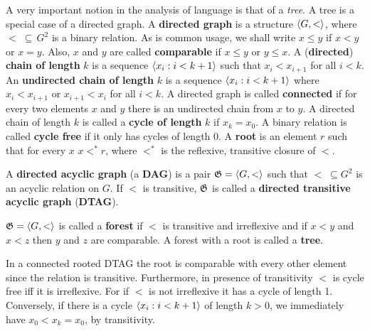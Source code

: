 A very important notion in the analysis of language is that of
a {\it tree}. A tree is a special case of a directed graph.
A \textbf{directed graph} is a structure $\langle G, <\rangle$, where
$<\; \subseteq\, G^2$ is a binary relation. As is common usage,
we shall write $x \leq y$ if $x < y$ or $x = y$. Also, $x$ and $y$
are called \textbf{comparable} if $x \leq y$ or $y \leq x$. A
(\textbf{directed}) \textbf{chain of length} $k$ is  a sequence
$\langle x_i : i < k + 1\rangle$ such that $x_i < x_{i+1}$ for all
$i < k$. An \textbf{undirected chain of length} $k$ is a sequence
$\langle x_i : i < k + 1\rangle$ where $x_i < x_{i+1}$ or
$x_{i+1} < x_i$ for all $i < k$. A directed graph is called
\textbf{connected} if for every two elements $x$ and $y$ there is
an undirected chain from $x$ to $y$. A directed chain
of length $k$ is called a \textbf{cycle of length} $k$
if $x_k = x_0$. A binary relation is called \textbf{cycle free} if
it only has cycles of length 0. A \textbf{root} is an element $r$
such that for every $x$ $x <^{\ast} r$, where $<^{\ast}$ is the 
reflexive, transitive closure of $<$. 
\begin{defn}
A \textbf{directed acyclic graph} (a \textbf{DAG}) 
is a pair $\mathfrak{G} = \langle G, <\rangle$ such that $<\; \subseteq G^2$
is an acyclic relation on $G$. If $<$ is transitive, 
$\mathfrak{G}$ is called a \textbf{directed transitive acyclic graph} 
(\textbf{DTAG}).
\end{defn}
\begin{defn}
$\mathfrak{G} = \langle G, <\rangle$ is called a \textbf{forest} if $<$
is transitive and irreflexive and if $x < y$ and $x < z$ then
$y$ and $z$ are comparable. A forest with a root
is called a \textbf{tree}.
\end{defn}
In a connected rooted DTAG the root is comparable
with every other element since the relation is transitive. Furthermore,
in presence of transitivity $<$ is cycle free iff it is
irreflexive. For if $<$ is not irreflexive it has a cycle of length 1.
Conversely, if there is a cycle $\langle x_i : i < k+1\rangle$ of length
$k  > 0$, we immediately have $x_0 < x_k = x_0$, by transitivity.

